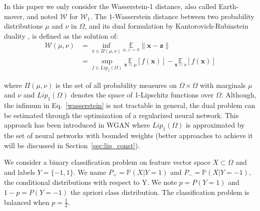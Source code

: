 \documentclass{article}
\newcommand{\W}{\mathcal{W}}
\begin{document}
In this paper we only consider the Wasserstein-1 distance, also called Earth-mover, and noted $\W$ for $\W_1$.
The $1$-Wasserstein distance between two probability distributions $\mu$ and $\nu$ in $\Omega$, and its dual formulation by Kantorovich-Rubinstein duality \cite{villani2008}, is defined as the solution of:
\begin{subequations}

\begin{align}
\W(\mu,\nu) & = \inf_{\pi \in \Pi(\mu,\nu)}\underset{x,z \sim \pi}{\mathbb{E}}\parallel \textbf{x}-\textbf{z} \parallel \label{wasserstein}\\
  & =\sup_{f \in Lip_1(\Omega)} \underset{\textbf{x} \sim \mu}{\mathbb{E}} \left[f(\textbf{x} )\right] -\underset{\textbf{x}  \sim \nu}{\mathbb{E}} \left[f(\textbf{x} )\right] \label{kantorovich}
\end{align}
\end{subequations}

where $\Pi(\mu,\nu)$ is the set of all probability measures on $\Omega\times \Omega$ with marginals $\mu$ and $\nu$ and $Lip_1(\Omega)$ denotes the space of 1-Lipschitz functions over $\Omega$. 
Although, the infimum in Eq.~\eqref{wasserstein} is not tractable in general, the dual problem can be estimated through the optimization of a regularized neural network. This approach has been introduced in WGAN  \cite{Arjovsky2017} where $Lip_1(\Omega)$ is approximated by the set of neural networks with bounded weights (better approaches to achieve it will be discussed in Section~\ref{sec:lip_const}). 


We consider a binary classification problem on feature vector space $X\subset \Omega$ and and labels $Y= \{-1,1\}$. We name $P_+=\mathbb{P}(X|Y=1)$ and  $P_-=\mathbb{P}(X|Y=-1)$, the conditional distributions with respect to Y. We note $p=P(Y=1)$ and $1-p=P(Y=-1)$ the apriori class distribution. The classification problem is balanced when $p=\frac{1}{2}$.\\
\end{document}

